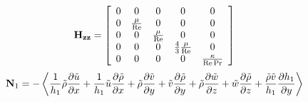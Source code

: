 \begin{equation*}
  {\bf{H}}_{{\bf{zz}}}  = \left[ {\begin{array}{*{20}c}
   0 & 0 & 0 & 0 & 0  \\
   0 & {\frac{\mu }{{{\mathop{\rm Re}\nolimits} }}} & 0 & 0 & 0  \\
   0 & 0 & {\frac{\mu }{{{\mathop{\rm Re}\nolimits} }}} & 0 & 0  \\
   0 & 0 & 0 & {\frac{4}{3}\frac{\mu }{{{\mathop{\rm Re}\nolimits} }}} & 0  \\
   0 & 0 & 0 & 0 & {\frac{\kappa }{{{\mathop{\rm Re}\nolimits} \Pr }}}  \\
\end{array}} \right]
\end{equation*}
\begin{equation*}
  {\bf{N}}_1  =  - \left\langle {\frac{1}{{h_1 }}\tilde \rho \frac{{\partial \tilde u}}{{\partial x}} + \frac{1}{{h_1 }}\tilde u\frac{{\partial \tilde \rho }}{{\partial x}} + \tilde \rho \frac{{\partial \tilde v}}{{\partial y}} + \tilde v\frac{{\partial \tilde \rho }}{{\partial y}} + \tilde \rho \frac{{\partial \tilde w}}{{\partial z}} + \tilde w\frac{{\partial \tilde \rho }}{{\partial z}} + \frac{{\tilde \rho \tilde v}}{{h_1 }}\frac{{\partial h_1 }}{{\partial y}}} \right\rangle
\end{equation*}
